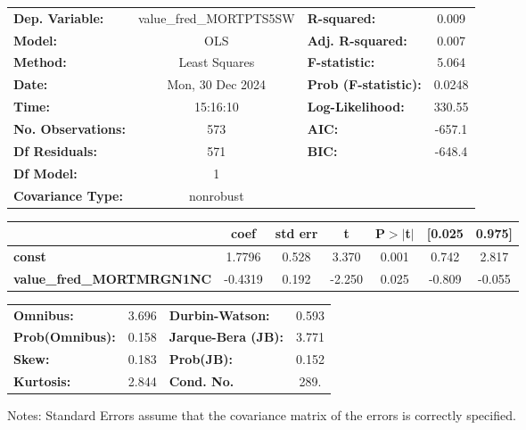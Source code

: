 \begin{center}
\begin{tabular}{lclc}
\toprule
\textbf{Dep. Variable:}           & value\_fred\_MORTPTS5SW & \textbf{  R-squared:         } &     0.009   \\
\textbf{Model:}                   &           OLS           & \textbf{  Adj. R-squared:    } &     0.007   \\
\textbf{Method:}                  &      Least Squares      & \textbf{  F-statistic:       } &     5.064   \\
\textbf{Date:}                    &     Mon, 30 Dec 2024    & \textbf{  Prob (F-statistic):} &   0.0248    \\
\textbf{Time:}                    &         15:16:10        & \textbf{  Log-Likelihood:    } &    330.55   \\
\textbf{No. Observations:}        &             573         & \textbf{  AIC:               } &    -657.1   \\
\textbf{Df Residuals:}            &             571         & \textbf{  BIC:               } &    -648.4   \\
\textbf{Df Model:}                &               1         & \textbf{                     } &             \\
\textbf{Covariance Type:}         &        nonrobust        & \textbf{                     } &             \\
\bottomrule
\end{tabular}
\begin{tabular}{lcccccc}
                                  & \textbf{coef} & \textbf{std err} & \textbf{t} & \textbf{P$> |$t$|$} & \textbf{[0.025} & \textbf{0.975]}  \\
\midrule
\textbf{const}                    &       1.7796  &        0.528     &     3.370  &         0.001        &        0.742    &        2.817     \\
\textbf{value\_fred\_MORTMRGN1NC} &      -0.4319  &        0.192     &    -2.250  &         0.025        &       -0.809    &       -0.055     \\
\bottomrule
\end{tabular}
\begin{tabular}{lclc}
\textbf{Omnibus:}       &  3.696 & \textbf{  Durbin-Watson:     } &    0.593  \\
\textbf{Prob(Omnibus):} &  0.158 & \textbf{  Jarque-Bera (JB):  } &    3.771  \\
\textbf{Skew:}          &  0.183 & \textbf{  Prob(JB):          } &    0.152  \\
\textbf{Kurtosis:}      &  2.844 & \textbf{  Cond. No.          } &     289.  \\
\bottomrule
\end{tabular}
\end{center}

Notes: \newline
 [1] Standard Errors assume that the covariance matrix of the errors is correctly specified.